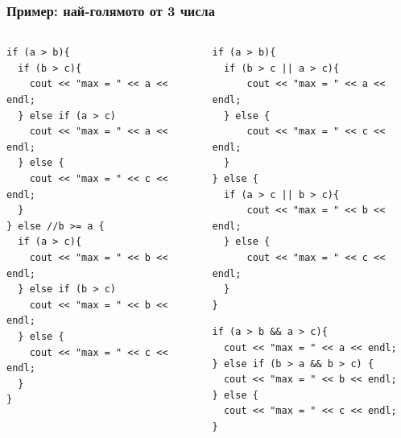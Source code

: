 \documentclass{beamer}
\begin{document}
\begin{frame}[fragile]
\frametitle{Пример: най-голямото от 3 числа}


\begin{columns}[t]
  \begin{column}{0.3\textwidth}
\begin{lstlisting}
if (a > b){
  if (b > c){
    cout << "max = " << a << endl;
  } else if (a > c)
    cout << "max = " << a << endl;
  } else {
    cout << "max = " << c << endl;
  }
} else //b >= a {
  if (a > c){
    cout << "max = " << b << endl;
  } else if (b > c)
    cout << "max = " << b << endl;
  } else {
    cout << "max = " << c << endl;
  }
}

\end{lstlisting}

  \end{column}

\pause
  \begin{column}{0.3\textwidth}
\begin{lstlisting}
if (a > b){
  if (b > c || a > c){
      cout << "max = " << a << endl;
  } else {
      cout << "max = " << c << endl;
  }
} else {
  if (a > c || b > c){
      cout << "max = " << b << endl;
  } else {
      cout << "max = " << c << endl;
  }
}
\end{lstlisting}

\pause

\begin{lstlisting}
if (a > b && a > c){
  cout << "max = " << a << endl;
} else if (b > a && b > c) {
  cout << "max = " << b << endl;
} else {
  cout << "max = " << c << endl;
}
\end{lstlisting}
  \end{column}
\end{columns}


\end{frame}
\end{document}
